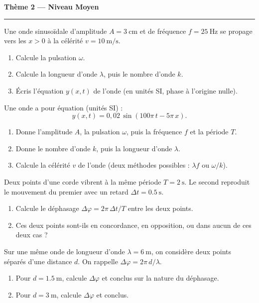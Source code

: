 \documentclass[11pt,a4paper]{article}
\begin{document}
\begin{center}
{\large\bfseries\color{primarydark} Thème 2 — Niveau Moyen}\\[-2pt]
{\color{primary}\rule{5cm}{1pt}}
\end{center}

\begin{exo}
Une onde sinusoïdale d'amplitude $A=\SI{3}{\centi\metre}$ et de fréquence $f=\SI{25}{\hertz}$
se propage vers les $x>0$ à la célérité $v=\SI{10}{\metre\per\second}$.
\begin{enumerate}[label=\alph*)]
  \item Calcule la pulsation $\omega$.
  \item Calcule la longueur d'onde $\lambda$, puis le nombre d'onde $k$.
  \item Écris l'équation $y(x,t)$ de l'onde (en unités SI, phase à l'origine nulle).
\end{enumerate}
\end{exo}

\begin{exo}
Une onde a pour équation (unités SI) :
\[ y(x,t)=0{,}02\,\sin\!\left(100\pi\,t - 5\pi\,x\right). \]
\begin{enumerate}[label=\alph*)]
  \item Donne l'amplitude $A$, la pulsation $\omega$, puis la fréquence $f$ et la période $T$.
  \item Donne le nombre d'onde $k$, puis la longueur d'onde $\lambda$.
  \item Calcule la célérité $v$ de l'onde (deux méthodes possibles : $\lambda f$ ou $\omega/k$).
\end{enumerate}
\end{exo}

\begin{exo}
Deux points d'une corde vibrent à la même période $T=\SI{2}{\second}$. Le second reproduit le
mouvement du premier avec un retard $\Delta t=\SI{0.5}{\second}$.
\begin{enumerate}[label=\alph*)]
  \item Calcule le déphasage $\Delta\varphi=2\pi\,\Delta t/T$ entre les deux points.
  \item Ces deux points sont-ils en concordance, en opposition, ou dans aucun de ces deux cas ?
\end{enumerate}
\end{exo}

\begin{exo}
Sur une même onde de longueur d'onde $\lambda=\SI{6}{\metre}$, on considère deux points séparés
d'une distance $d$. On rappelle $\Delta\varphi=2\pi\,d/\lambda$.
\begin{enumerate}[label=\alph*)]
  \item Pour $d=\SI{1.5}{\metre}$, calcule $\Delta\varphi$ et conclus sur la nature du déphasage.
  \item Pour $d=\SI{3}{\metre}$, calcule $\Delta\varphi$ et conclus.
\end{enumerate}
\end{exo}
\end{document}
